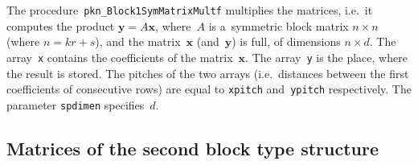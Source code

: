 \vspace{\bigskipamount}
The procedure~\texttt{pkn\_Block1SymMatrixMultf} multiplies the matrices,
i.e.\ it computes the product $\bm{y}=A\bm{x}$, where~$A$ is a~symmetric block
matrix $n\times n$ (where $n=kr+s$), and the matrix~$\bm{x}$ (and~$\bm{y}$)
is full, of dimensions $n\times d$. The array~\texttt{x} contains the
coefficients of the matrix~$\bm{x}$.
The array~\texttt{y} is the place, where the result is stored. The pitches of
the two arrays (i.e.\ distances between the first coefficients of consecutive
rows) are equal to \texttt{xpitch} and~\texttt{ypitch} respectively.
The parameter \texttt{spdimen} specifies~$d$.


\newpage
\subsection{Matrices of the second block type structure}

